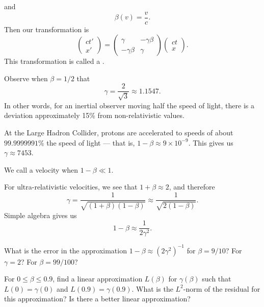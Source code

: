 and
\begin{equation}
\beta(v) = \frac{v}{c}.
\end{equation}
Then our transformation is
\begin{equation}
\begin{pmatrix}ct'\\ x'
\end{pmatrix}
=\begin{pmatrix}\gamma & -\gamma\beta\\
-\gamma\beta & \gamma
\end{pmatrix}
\begin{pmatrix}ct\\ x
\end{pmatrix}.
\end{equation}
This transformation is called a .

\M
Observe when $\beta=1/2$ that
\begin{equation}
\gamma = \frac{2}{\sqrt{3}}\approx 1.1547.
\end{equation}
In other words, for an inertial observer moving half the speed of light,
there is a deviation approximately 15\% from non-relativistic values.

At the Large Hadron Collider, protons are accelerated to speeds of about
$99.9999991\%$ the speed of light --- that is, $1-\beta\approx9\times10^{-9}$.
This gives us $\gamma\approx7453$.

\begin{definition}
We call a velocity  when $1-\beta\ll1$.
\end{definition}

\begin{remark}
For ultra-relativistic velocities, we see that $1+\beta\approx2$, and
therefore
\begin{equation}
\gamma = \frac{1}{\sqrt{(1 + \beta)(1 - \beta)}}
\approx\frac{1}{\sqrt{2(1 - \beta)}}.
\end{equation}
Simple algebra gives us
\begin{equation}
1 - \beta\approx\frac{1}{2\gamma^{2}}.
\end{equation}
\end{remark}

\begin{exercise}
What is the error in the approximation
$1-\beta\approx(2\gamma^{2})^{-1}$ for $\beta=9/10$? For $\gamma=2$? For $\beta=99/100$?
\end{exercise}

\begin{exercise}
For $0\leq\beta\leq0.9$, find a linear approximation $L(\beta)$ for
$\gamma(\beta)$ such that $L(0)=\gamma(0)$ and
$L(0.9)=\gamma(0.9)$. What is the $L^{2}$-norm of the residual for this approximation?
Is there a better linear approximation?
\end{exercise}

